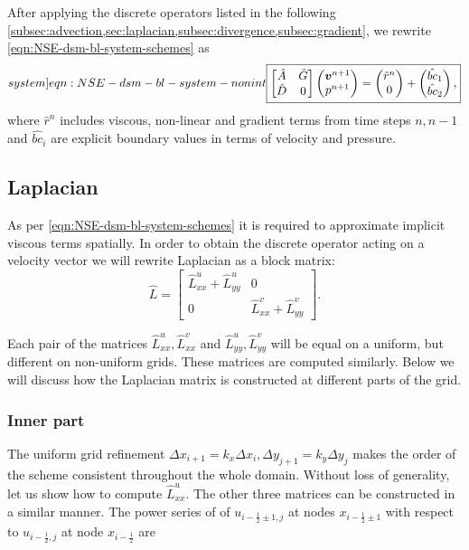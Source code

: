 \documentclass{article}
\numberwithin{equation}{section}
\begin{document}
After applying the discrete operators listed in the following \cref{subsec:advection,sec:laplacian,subsec:divergence,subsec:gradient}, we rewrite \cref{eqn:NSE-dsm-bl-system-schemes}  as
\begin{equation}\label[system]{eqn:NSE-dsm-bl-system-nonint}
	\boxed{\begin{bmatrix}
		\hat{A} & \hat{G} \\
		\hat{D} & 0
	\end{bmatrix}
	\begin{pmatrix}
		\boldsymbol{v}^{n+1} \\ 
		p^{n+1}
	\end{pmatrix}
	=
	\begin{pmatrix}
		\hat{r}^n \\
		0
	\end{pmatrix}
	+
	\begin{pmatrix}
		\hat{bc}_1\\
		\hat{bc}_2
	\end{pmatrix},}
\end{equation}
where $\hat{r}^n$ includes viscous, non-linear and gradient terms from time steps $n,n-1$ and $\hat{bc}_i$ are explicit boundary values in terms of velocity and pressure.


\subsection{Laplacian}\label{sec:laplacian}

As per \cref{eqn:NSE-dsm-bl-system-schemes} it is required to approximate implicit viscous terms spatially. In order to obtain the discrete operator acting on a velocity vector we will rewrite Laplacian as a block matrix:
\begin{equation*}
	\hat L=
	\begin{bmatrix}
  \hat{L}^u_{xx}+\hat{L}^u_{yy} & 0 \\
  0 & \hat{L}^v_{xx}+\hat{L}^v_{yy}
\end{bmatrix}.
\end{equation*}

Each pair of the matrices $\hat{L}^u_{xx},\hat{L}^v_{xx}$ and $\hat{L}^u_{yy},\hat{L}^v_{yy}$ will be equal on a uniform, but different on non-uniform grids. These matrices are computed similarly. Below we will discuss how the Laplacian matrix is constructed at different parts of the grid.

\subsubsection{Inner part}\label{subsubsec:laplacian-inner}
The uniform grid refinement $\Delta x_{i+1}=k_x\Delta x_i,\Delta y_{j+1}=k_y\Delta y_j$ makes the order of the scheme consistent throughout the whole domain. Without loss of generality, let us show how to compute $\hat{L}^u_{xx}$. The other three matrices can be constructed in a similar manner. The power series of of $u_{i-\frac{1}{2}\pm 1,j}$ at nodes $x_{i - \frac{1}{2}\pm 1}$ with respect to $u_{i - \frac{1}{2},j}$ at node $x_{i-\frac{1}{2}}$ are
\end{document}
